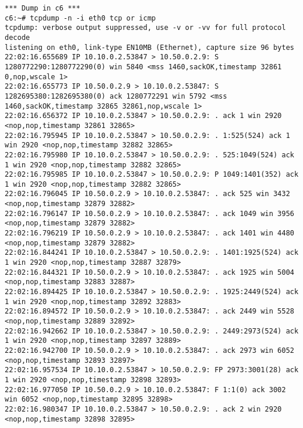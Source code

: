 \documentclass[a4paper,12pt]{article}
\begin{document}
\begin{lstlisting}
*** Dump in c6 ***
c6:~# tcpdump -n -i eth0 tcp or icmp
tcpdump: verbose output suppressed, use -v or -vv for full protocol decode
listening on eth0, link-type EN10MB (Ethernet), capture size 96 bytes
22:02:16.655689 IP 10.10.0.2.53847 > 10.50.0.2.9: S 1280772290:1280772290(0) win 5840 <mss 1460,sackOK,timestamp 32861 0,nop,wscale 1>
22:02:16.655773 IP 10.50.0.2.9 > 10.10.0.2.53847: S 1282695380:1282695380(0) ack 1280772291 win 5792 <mss 1460,sackOK,timestamp 32865 32861,nop,wscale 1>
22:02:16.656372 IP 10.10.0.2.53847 > 10.50.0.2.9: . ack 1 win 2920 <nop,nop,timestamp 32861 32865>
22:02:16.795945 IP 10.10.0.2.53847 > 10.50.0.2.9: . 1:525(524) ack 1 win 2920 <nop,nop,timestamp 32882 32865>
22:02:16.795980 IP 10.10.0.2.53847 > 10.50.0.2.9: . 525:1049(524) ack 1 win 2920 <nop,nop,timestamp 32882 32865>
22:02:16.795985 IP 10.10.0.2.53847 > 10.50.0.2.9: P 1049:1401(352) ack 1 win 2920 <nop,nop,timestamp 32882 32865>
22:02:16.796045 IP 10.50.0.2.9 > 10.10.0.2.53847: . ack 525 win 3432 <nop,nop,timestamp 32879 32882>
22:02:16.796147 IP 10.50.0.2.9 > 10.10.0.2.53847: . ack 1049 win 3956 <nop,nop,timestamp 32879 32882>
22:02:16.796219 IP 10.50.0.2.9 > 10.10.0.2.53847: . ack 1401 win 4480 <nop,nop,timestamp 32879 32882>
22:02:16.844241 IP 10.10.0.2.53847 > 10.50.0.2.9: . 1401:1925(524) ack 1 win 2920 <nop,nop,timestamp 32887 32879>
22:02:16.844321 IP 10.50.0.2.9 > 10.10.0.2.53847: . ack 1925 win 5004 <nop,nop,timestamp 32883 32887>
22:02:16.894425 IP 10.10.0.2.53847 > 10.50.0.2.9: . 1925:2449(524) ack 1 win 2920 <nop,nop,timestamp 32892 32883>
22:02:16.894572 IP 10.50.0.2.9 > 10.10.0.2.53847: . ack 2449 win 5528 <nop,nop,timestamp 32889 32892>
22:02:16.942662 IP 10.10.0.2.53847 > 10.50.0.2.9: . 2449:2973(524) ack 1 win 2920 <nop,nop,timestamp 32897 32889>
22:02:16.942700 IP 10.50.0.2.9 > 10.10.0.2.53847: . ack 2973 win 6052 <nop,nop,timestamp 32893 32897>
22:02:16.957534 IP 10.10.0.2.53847 > 10.50.0.2.9: FP 2973:3001(28) ack 1 win 2920 <nop,nop,timestamp 32898 32893>
22:02:16.977050 IP 10.50.0.2.9 > 10.10.0.2.53847: F 1:1(0) ack 3002 win 6052 <nop,nop,timestamp 32895 32898>
22:02:16.980347 IP 10.10.0.2.53847 > 10.50.0.2.9: . ack 2 win 2920 <nop,nop,timestamp 32898 32895>
\end{lstlisting}
\end{document}
